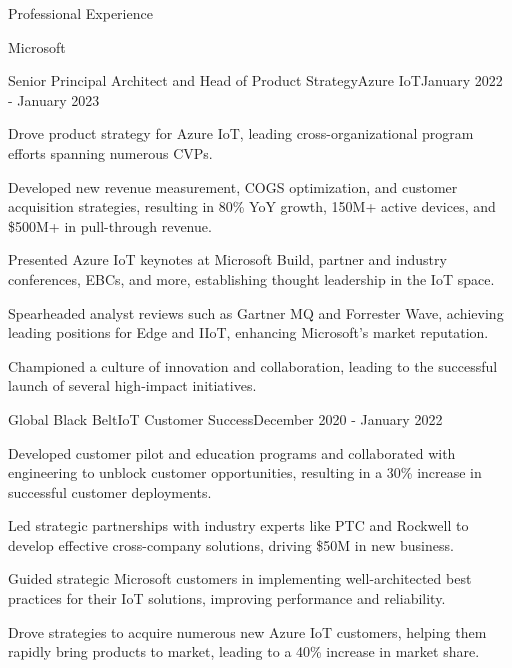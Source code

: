 \documentclass{resume} %
\begin{document}
\begin{rSection}{Professional Experience}
\begin{rCompany}{Microsoft}{}{}
\begin{rSubSubsection}{Senior Principal Architect and Head of Product Strategy}{Azure IoT}{January 2022 - January 2023}
        \item Drove product strategy for Azure IoT, leading cross-organizational program efforts spanning numerous CVPs.
        \item Developed new revenue measurement, COGS optimization, and customer acquisition strategies, resulting in 80\% YoY growth, 150M+ active devices, and \$500M+ in pull-through revenue.
        \item Presented Azure IoT keynotes at Microsoft Build, partner and industry conferences, EBCs, and more, establishing thought leadership in the IoT space.
        \item Spearheaded analyst reviews such as Gartner MQ and Forrester Wave, achieving leading positions for Edge and IIoT, enhancing Microsoft's market reputation.
        \item Championed a culture of innovation and collaboration, leading to the successful launch of several high-impact initiatives.
    
    \end{rSubSubsection}
    
    \begin{rSubSubsection}{Global Black Belt}{IoT Customer Success}{December 2020 - January 2022}
        \item Developed customer pilot and education programs and collaborated with engineering to unblock customer opportunities, resulting in a 30\% increase in successful customer deployments.
        \item Led strategic partnerships with industry experts like PTC and Rockwell to develop effective cross-company solutions, driving \$50M in new business.
        \item Guided strategic Microsoft customers in implementing well-architected best practices for their IoT solutions, improving performance and reliability.
        \item Drove strategies to acquire numerous new Azure IoT customers, helping them rapidly bring products to market, leading to a 40\% increase in market share.
    \end{rSubSubsection}
    

\end{rCompany}
\end{rSection}
\end{document}

